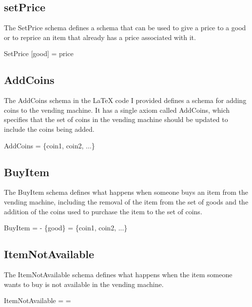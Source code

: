 \documentclass{article}
\begin{document}
\subsection{setPrice}
The SetPrice schema defines a schema that can be used to give a price to a good or to reprice an item that already has a price associated with it.
\begin{schema}{SetPrice}
[good] = price
\end{schema}




\subsection{AddCoins}
The AddCoins schema in the LaTeX code I provided defines a schema for adding coins to the vending machine. It has a single axiom called AddCoins, which specifies that the set of coins in the vending machine should be updated to include the coins being added.
\begin{schema}{AddCoins}
 =  \cup \{coin1, coin2, ...\}
\end{schema}




\subsection{BuyItem}
The BuyItem schema defines what happens when someone buys an item from the vending machine, including the removal of the item from the set of goods and the addition of the coins used to purchase the item to the set of coins.
\begin{schema}{BuyItem}
 =  - \{good\}
 =  \cup \{coin1, coin2, ...\}
\end{schema}



\subsection{ItemNotAvailable}
The ItemNotAvailable schema defines what happens when the item someone wants to buy is not available in the vending machine.
\begin{schema}{ItemNotAvailable}
 = 
 = 
\end{schema}
\end{document}
